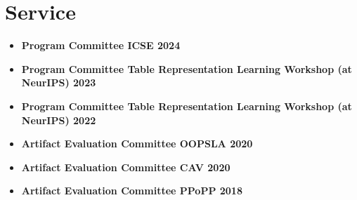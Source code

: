 \documentclass[11pt,a4paper,sans]{moderncv}
\begin{document}
\section{Service}
\begin{itemize}
  \item \textbf{Program Committee ICSE 2024}
  \item \textbf{Program Committee Table Representation Learning Workshop (at NeurIPS) 2023}
  \item \textbf{Program Committee Table Representation Learning Workshop (at NeurIPS) 2022}
  \item \textbf{Artifact Evaluation Committee OOPSLA 2020}
  \item \textbf{Artifact Evaluation Committee CAV 2020}
  \item \textbf{Artifact Evaluation Committee PPoPP 2018}


\end{itemize}
\end{document}
